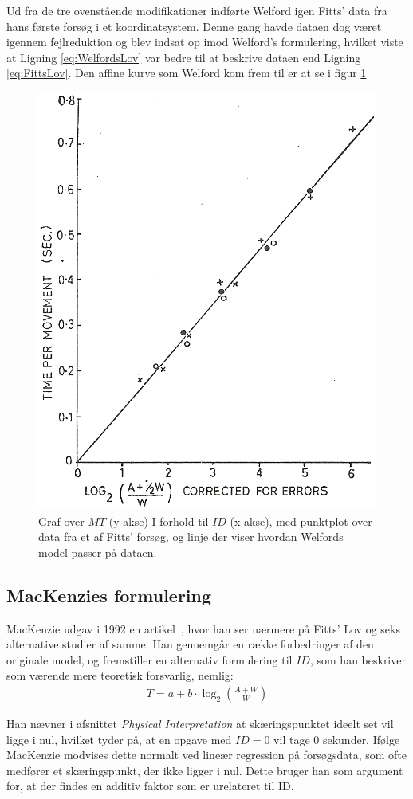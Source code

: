 Ud fra de tre ovenstående modifikationer indførte Welford igen Fitts' data fra hans første forsøg i et koordinatsystem. Denne gang havde dataen dog været igennem fejlreduktion og blev indsat op imod Welford's formulering, hvilket viste at Ligning \ref{eq:WelfordsLov} var bedre til at beskrive dataen end Ligning \ref{eq:FittsLov}. Den affine kurve som Welford kom frem til er at se i figur \ref{fig:WelfordGraf2}
\begin{figure}[h]
\centering
\includegraphics[width=.5\linewidth]{images/illustrations/welford_plot_2}
\caption{Graf over $MT$ (y-akse) I forhold til $ID$ (x-akse), med punktplot over data fra et af Fitts' forsøg, og linje der viser hvordan Welfords model passer på dataen.}
\label{fig:WelfordGraf2}
\end{figure}

\subsection*{MacKenzies formulering}
MacKenzie udgav i 1992 en artikel~\cite{mackenzie1992}, hvor han ser nærmere på Fitts' Lov og seks alternative studier af samme. Han gennemgår en række forbedringer af den originale model, og fremstiller en alternativ formulering til $ID$, som han beskriver som værende mere teoretisk forsvarlig, nemlig:
\begin{align}
T=a+b\cdot\log_2\left({\frac{A+W}{W}}\right)
\end{align}

Han nævner i afsnittet \emph{Physical Interpretation} at skæringspunktet ideelt set vil ligge i nul, hvilket tyder på, at en opgave med $ID=0$ vil tage 0 sekunder. Ifølge MacKenzie modvises dette normalt ved lineær regression på forsøgsdata, som ofte medfører et skæringspunkt, der ikke ligger i nul. Dette bruger han som argument for, at der findes en additiv faktor som er urelateret til ID.\\

